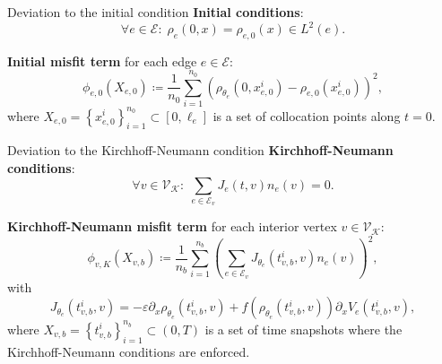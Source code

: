 \documentclass[9pt]{beamer}
\begin{document}
\begin{frame}{Deviation to the initial condition}
    \textbf{Initial conditions}:
    \begin{equation*}
        \forall e \in \mathcal{E} \colon \; \rho_e \left( 0,x \right)  = \rho_{e, 0} \left( x \right) \in L^2 \left( e \right).
    \end{equation*}

    \vspace{3mm}

    \textbf{Initial misfit term} for each edge $e \in \mathcal{E}$:
    \begin{equation*} 
        \phi_{e,0}  \left( X_{e,0} \right) \coloneqq \frac{1}{n_0} \sum_{i=1}^{n_0}  \left( \rho_{\theta_e}  \left( 0,x_{e,0}^i \right) - \rho_{e,0} \left( x_{e,0}^i \right) \right)^2, 
    \end{equation*} 
    where $X_{e,0} = \left\{ x_{e,0}^i \right\}_{i=1}^{n_0} \subset \left[0, \ell_e\right]$ is a set of collocation points along $t=0$.
\end{frame}



\begin{frame}{Deviation to the Kirchhoff-Neumann condition}
    \textbf{Kirchhoff-Neumann conditions}:
    \begin{equation*}
        \forall v \in \mathcal{V}_\mathcal{K} \colon \; \sum_{e\in \mathcal{E}_v} J_e \left( t,v \right)  n_e  \left( v \right) =0.
    \end{equation*}
    
    \vspace{3mm}

    \textbf{Kirchhoff-Neumann misfit term} for each interior vertex $v \in \mathcal{V}_{\mathcal{K}}$:
    \begin{equation*} 
        \phi_{v,K}  \left( X_{v,b} \right) \coloneqq \frac{1}{n_b} \sum_{i=1}^{n_b}  \left( \sum_{e \in \mathcal{E}_v}  J_{\theta_e}\left( t_{v,b}^i, v \right)  n_e  \left( v \right) \right)^2, 
    \end{equation*} 
    with 
    \begin{equation*} 
        J_{\theta_e}\left( t_{v,b}^i, v \right) = - \varepsilon \partial_x \rho_{\theta_e}  \left( t_{v,b}^i, v \right) + f \left( \rho_{\theta_e}  \left( t_{v,b}^i, v \right) \right) \partial_x V_e \left( t_{v,b}^i, v \right),
    \end{equation*}
    where $X_{v,b} = \left\{ t_{v,b}^i \right\}_{i=1}^{n_b} \subset \left( 0,T \right)$ is a set of time snapshots where the Kirchhoff-Neumann conditions are enforced.
\end{frame}
\end{document}
